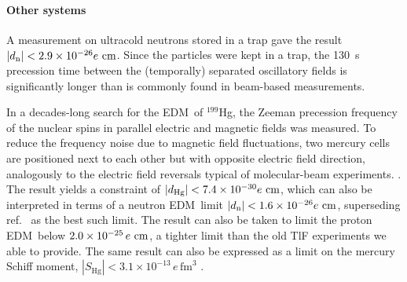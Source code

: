 \paragraph{Other systems}


A measurement on ultracold neutrons stored in a trap gave the result
$|d_\text{n}|<2.9\times10^{-26}e~\mathrm{cm}$. Since the particles were kept in a trap,
the 130~s precession time between the (temporally) separated oscillatory fields
is significantly longer than is commonly found in beam-based measurements.
\cite{baker2006improved}

In a decades-long search for the \gls{EDM}\ of $^{199}$Hg, the Zeeman precession
frequency of the nuclear spins in parallel electric and magnetic fields was
measured. To reduce the frequency noise due to magnetic field fluctuations, two
mercury cells are positioned next to each other but with opposite electric field
direction, analogously to the electric field reversals typical of molecular-beam
experiments. \cite{romalis2001new}. The result yields a constraint of
$|d_\text{Hg}|<7.4\times10^{-30}e~\mathrm{cm}$, which can also be interpreted in terms of
a neutron \gls{EDM}\ limit $|d_\text{n}|<1.6\times10^{-26}e~\mathrm{cm}$, superseding
ref.~\cite{pendlebury2015revised} as the best such limit. The result can also be
taken to limit the proton \gls{EDM}\ below $2.0\times10^{-25}\,e~\mathrm{cm}$, a tighter
limit than the old TlF experiments we able to provide.
\cite{griffith2009improved,graner2016reduced} The same result can also be
expressed as a limit on the mercury Schiff moment,
$|S_\text{Hg}|<3.1\times10^{-13}\,e\,\text{fm}^3$
\cite[eqn~6]{graner2016reduced}.

